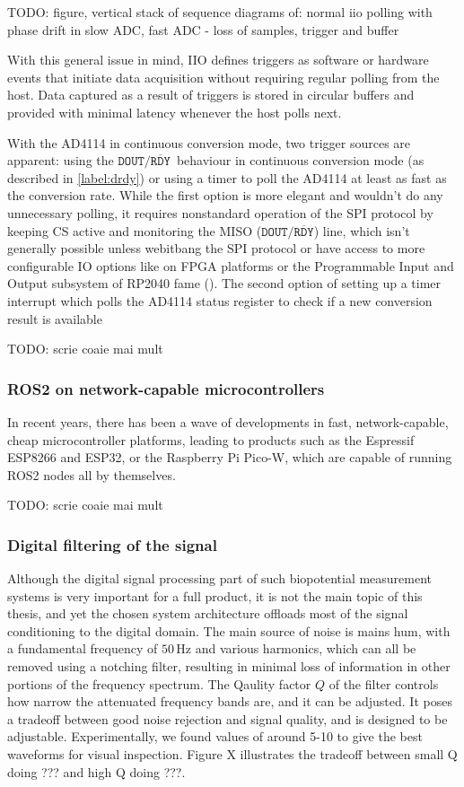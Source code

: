 \documentclass{thesis}
\newcommand{\todo}[1]{{\color{red}TODO: #1}}
\newcommand{\we}{we}
\newcommand{\Hz}{\,\text{Hz}}
\newcommand{\drdy}{{\ensuremath{\mathtt{DOUT/}\overline{\mathtt{RDY}}}}}
\begin{document}
{\todo{figure, vertical stack of sequence diagrams of: normal iio polling with phase drift in slow ADC, fast ADC - loss of samples, trigger and buffer}

With this general issue in mind, IIO defines triggers as software or hardware events that initiate data acquisition without requiring regular polling from the host. Data captured as a result of triggers is stored in circular buffers and provided with minimal latency whenever the host polls next.

With the AD4114 in continuous conversion mode, two trigger sources are apparent: using the \drdy\ behaviour in continuous conversion mode (as described in \ref{label:drdy}) or using a timer to poll the AD4114 at least as fast as the conversion rate. While the first option is more elegant and wouldn't do any unnecessary polling, it requires nonstandard operation of the SPI protocol by keeping CS active and monitoring the MISO (\drdy) line, which isn't generally possible unless \we bitbang the SPI protocol or have access to more configurable IO options like on FPGA platforms or the Programmable Input and Output subsystem of RP2040 fame (\cite{Smith2021}). The second option of setting up a timer interrupt which polls the AD4114 status register to check if a new conversion result is available

\todo{scrie coaie mai mult}

\subsubsection{ROS2 on network-capable microcontrollers}

In recent years, there has been a wave of developments in fast, network-capable, cheap microcontroller platforms, leading to products such as the Espressif ESP8266 and ESP32, or the Raspberry Pi Pico-W, which are capable of running ROS2 nodes all by themselves. 

\todo{scrie coaie mai mult}

\subsubsection{Digital filtering of the signal}

Although the digital signal processing part of such biopotential measurement systems is very important for a full product, it is not the main topic of this thesis, and yet the chosen system architecture offloads most of the signal conditioning to the digital domain. The main source of noise is mains hum, with a fundamental frequency of $50\Hz$ and various harmonics, which can all be removed using a notching filter, resulting in minimal loss of information in other portions of the frequency spectrum. The Qaulity factor $Q$ of the filter controls how narrow the attenuated frequency bands are, and it can be adjusted. It poses a tradeoff between good noise rejection and signal quality, and is designed to be adjustable. Experimentally, we found values of around 5-10 to give the best waveforms for visual inspection. Figure X illustrates the tradeoff between small Q doing ??? and high Q doing ???.

}
\end{document}
